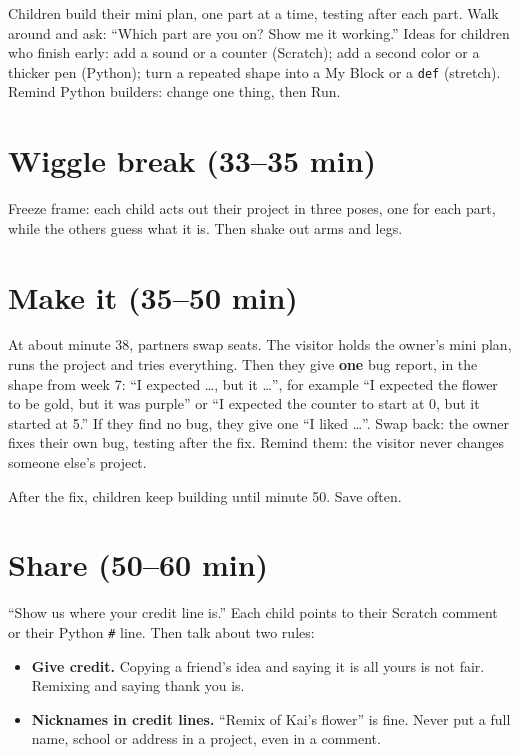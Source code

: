 \begin{freebuild}
Children build their mini plan, one part at a time, testing after each part. Walk around and ask: \enquote{Which part are you on? Show me it working.} Ideas for children who finish early: add a sound or a counter (Scratch); add a second color or a thicker pen (Python); turn a repeated shape into a My Block or a \texttt{def} (stretch). Remind Python builders: change one thing, then Run.
\end{freebuild}

\section{Wiggle break (33--35 min)}
Freeze frame: each child acts out their project in three poses, one for each part, while the others guess what it is. Then shake out arms and legs.

\section{Make it (35--50 min)}
\begin{bughunt}
At about minute 38, partners swap seats. The visitor holds the owner's mini plan, runs the project and tries everything. Then they give \textbf{one} bug report, in the shape from week 7: \enquote{I expected \ldots, but it \ldots}, for example \enquote{I expected the flower to be gold, but it was purple} or \enquote{I expected the counter to start at 0, but it started at 5.} If they find no bug, they give one \enquote{I liked \ldots}. Swap back: the owner fixes their own bug, testing after the fix. Remind them: the visitor never changes someone else's project.
\end{bughunt}

After the fix, children keep building until minute 50. Save often.

\section{Share (50--60 min)}
\begin{safety}
\enquote{Show us where your credit line is.} Each child points to their Scratch comment or their Python \texttt{\#} line. Then talk about two rules:
\begin{itemize}[leftmargin=1.2em,itemsep=0pt]
  \item \textbf{Give credit.} Copying a friend's idea and saying it is all yours is not fair. Remixing and saying thank you is.
  \item \textbf{Nicknames in credit lines.} \enquote{Remix of Kai's flower} is fine. Never put a full name, school or address in a project, even in a comment.
\end{itemize}
\end{safety}

